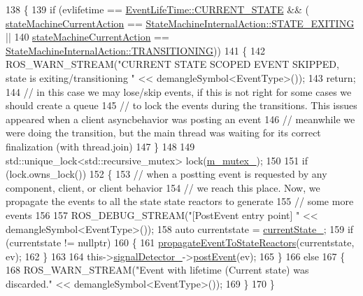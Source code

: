 \begin{DoxyCode}
138   \{
139     \textcolor{keywordflow}{if} (evlifetime == \hyperlink{namespacesmacc_a5063f47926ad2fe25120ed4b1e7b2c7ea49b599d413671f16f08d0dd18243c294}{EventLifeTime::CURRENT\_STATE} && (
      \hyperlink{classsmacc_1_1ISmaccStateMachine_a654a98ba86c4c1013ac3c371f293d950}{stateMachineCurrentAction} == 
      \hyperlink{namespacesmacc_a0889aff43c93fe5285109819d2898144a22bd5bb7935dd66f181d92efc273951e}{StateMachineInternalAction::STATE\_EXITING} ||
140                                                        \hyperlink{classsmacc_1_1ISmaccStateMachine_a654a98ba86c4c1013ac3c371f293d950}{stateMachineCurrentAction} 
      == \hyperlink{namespacesmacc_a0889aff43c93fe5285109819d2898144a5e174e130ee1847f37541ba5786207a3}{StateMachineInternalAction::TRANSITIONING}))
141     \{
142       ROS\_WARN\_STREAM(\textcolor{stringliteral}{"CURRENT STATE SCOPED EVENT SKIPPED, state is exiting/transitioning "} << 
      demangleSymbol<EventType>());
143       \textcolor{keywordflow}{return};
144       \textcolor{comment}{// in this case we may lose/skip events, if this is not right for some cases we should create a queue}
145       \textcolor{comment}{// to lock the events during the transitions. This issues appeared when a client asyncbehavior was
       posting an event}
146       \textcolor{comment}{// meanwhile we were doing the transition, but the main thread was waiting for its correct
       finalization (with thread.join)}
147     \}
148 
149     std::unique\_lock<std::recursive\_mutex> lock(\hyperlink{classsmacc_1_1ISmaccStateMachine_aac785541646e5c517273bf31072505a1}{m\_mutex\_});
150 
151     \textcolor{keywordflow}{if} (lock.owns\_lock())
152     \{
153       \textcolor{comment}{// when a postting event is requested by any component, client, or client behavior}
154       \textcolor{comment}{// we reach this place. Now, we propagate the events to all the state state reactors to generate}
155       \textcolor{comment}{// some more events}
156 
157       ROS\_DEBUG\_STREAM(\textcolor{stringliteral}{"[PostEvent entry point] "} << demangleSymbol<EventType>());
158       \textcolor{keyword}{auto} currentstate = \hyperlink{classsmacc_1_1ISmaccStateMachine_a9c6e7745205bcce80a301f2fbe8f7e99}{currentState\_};
159       \textcolor{keywordflow}{if} (currentstate != \textcolor{keyword}{nullptr})
160       \{
161         \hyperlink{classsmacc_1_1ISmaccStateMachine_a3d369c7cff22632ca85a8656000ba19c}{propagateEventToStateReactors}(currentstate, ev);
162       \}
163 
164       this->\hyperlink{classsmacc_1_1ISmaccStateMachine_a3982eb671f5f001cb047d3a467789986}{signalDetector\_}->\hyperlink{classsmacc_1_1SignalDetector_a6ab99d99cef8d101e39797a72daeb2b7}{postEvent}(ev);
165     \}
166     \textcolor{keywordflow}{else}
167     \{
168       ROS\_WARN\_STREAM(\textcolor{stringliteral}{"Event with lifetime (Current state) was discarded."} << demangleSymbol<EventType>());
169     \}
170   \}
\end{DoxyCode}
